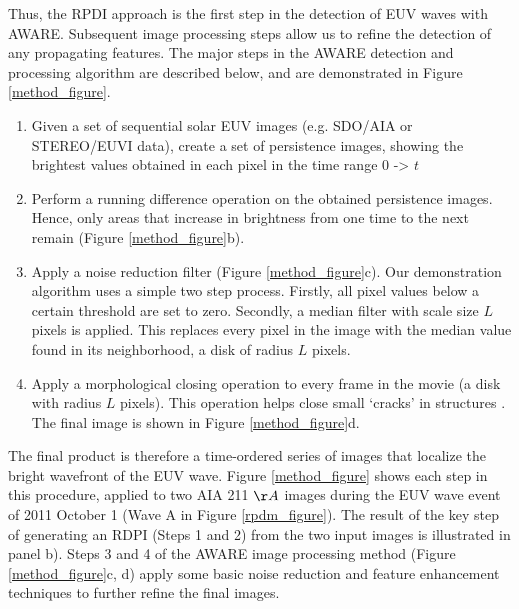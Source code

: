 Thus, the RPDI approach is the first step in the detection of EUV waves with AWARE. Subsequent image processing steps allow us to refine the detection of any propagating features. The major steps in the AWARE detection and processing algorithm are described below, and are demonstrated in Figure \ref{method_figure}.

\begin{enumerate}

\item Given a set of sequential solar EUV images (e.g. SDO/AIA or STEREO/EUVI data), create a set of persistence images, showing the brightest values obtained in each pixel in the time range 0 -> $t$

\item Perform a running difference operation on the obtained persistence images. Hence, only areas that increase in brightness from one time to the next remain (Figure \ref{method_figure}b).

\item Apply a noise reduction filter (Figure \ref{method_figure}c).  Our demonstration algorithm uses a simple two step process.  Firstly, all pixel values below a certain threshold are set to zero.  Secondly, a median filter with scale size $L$ pixels is applied.  This replaces every pixel in the image with the median value found in its neighborhood, a disk of radius $L$ pixels.

\item Apply a morphological closing \citep{2002dip..book.....G} operation to every frame in the movie (a disk with radius $L$ pixels).  This operation helps close small ‘cracks’ in structures \citep{2002dip..book.....G}.  The final image is shown in Figure \ref{method_figure}d.
\end{enumerate}

The final product is therefore a time-ordered series of images that localize the bright wavefront of the EUV wave. Figure \ref{method_figure} shows each step in this procedure, applied to two AIA 211 $\AA$ images during the EUV wave event of 2011 October 1 (Wave A in Figure \ref{rpdm_figure}). The result of the key step of generating an RDPI (Steps 1 and 2) from the two input images is illustrated in panel b). Steps 3 and 4 of the AWARE image processing method (Figure \ref{method_figure}c, d) apply some basic noise reduction and feature enhancement techniques to further refine the final images.  


